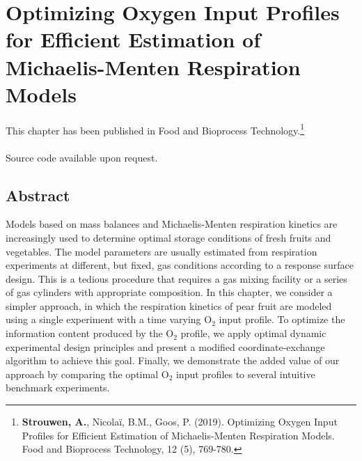 \cleardoublepage
\chapter{Optimizing Oxygen Input Profiles for Efficient Estimation of Michaelis-Menten Respiration Models}
\label{paper1}
This chapter has been published in Food and Bioprocess Technology.\footnote{\textbf{Strouwen, A.}, Nicolaï, B.M., Goos, P. (2019). Optimizing Oxygen Input Profiles for Efficient Estimation of Michaelis-Menten Respiration Models. Food and Bioprocess Technology, 12 (5), 769-780. }
\\
\\
{\color{red}Source code available upon request.}
\section*{Abstract}
Models based on mass balances and Michaelis-Menten respiration kinetics are increasingly used to determine optimal storage conditions of fresh fruits and vegetables. The model parameters are usually estimated from respiration experiments at different, but fixed, gas conditions according to a response surface design. This is a tedious procedure that requires a gas mixing facility or a series of gas cylinders with appropriate composition. In this chapter, we consider a simpler approach, in which the respiration kinetics of pear fruit are modeled using a single experiment with a time varying $\text{O}_2$ input profile. To optimize the information content produced by the $\text{O}_2$ profile, we apply optimal dynamic experimental design principles and present a modified coordinate-exchange algorithm to achieve this goal. Finally, we demonstrate the added value of our approach by comparing the optimal $\text{O}_2$ input profiles to several intuitive benchmark experiments.
